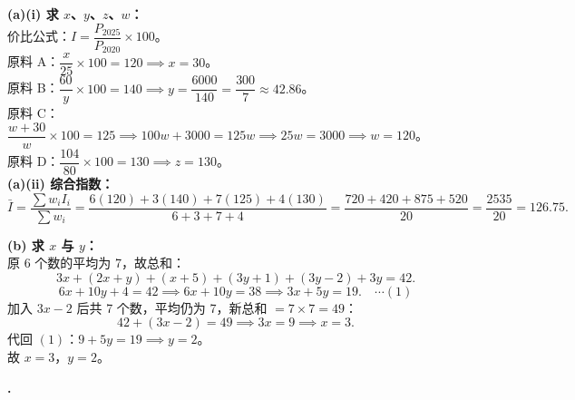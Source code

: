 \documentclass[12pt,a4paper]{ctexart}
\newcounter{qnum}
\newenvironment{question}
  {%
    \stepcounter{qnum}%
    \vspace{0.8em}%
    \noindent\textbf{\theqnum.}\enspace
  }
  {\par\vspace{0.4em}}
\newenvironment{solution}
  {%
    \par\noindent
  }
  {\par}
\begin{document}
\begin{solution}
    \textbf{(a)(i) 求 $x$、$y$、$z$、$w$：} \\
    价比公式：$I = \dfrac{P_{2025}}{P_{2020}}\times100$。\\
    原料 A：$\dfrac{x}{25}\times100 = 120 \implies x = 30$。\\
    原料 B：$\dfrac{60}{y}\times100 = 140 \implies y = \dfrac{6000}{140} = \dfrac{300}{7} \approx 42.86$。\\
    原料 C：$\dfrac{w+30}{w}\times100 = 125 \implies 100w+3000=125w \implies 25w=3000 \implies w=120$。\\
    原料 D：$\dfrac{104}{80}\times100 = 130 \implies z = 130$。\\

    \textbf{(a)(ii) 综合指数：} \\
    \[
        \bar{I} = \frac{\sum w_i I_i}{\sum w_i}
        = \frac{6(120)+3(140)+7(125)+4(130)}{6+3+7+4}
        = \frac{720+420+875+520}{20}
        = \frac{2535}{20}
        = 126.75.
    \]

    \textbf{(b) 求 $x$ 与 $y$：} \\
    原 6 个数的平均为 7，故总和：
    \[
        3x + (2x+y) + (x+5) + (3y+1) + (3y-2) + 3y = 42.
    \]
    \[
        6x + 10y + 4 = 42 \implies 6x + 10y = 38 \implies 3x + 5y = 19. \quad\cdots(1)
    \]
    加入 $3x-2$ 后共 7 个数，平均仍为 7，新总和 $= 7\times7 = 49$：
    \[
        42 + (3x-2) = 49 \implies 3x = 9 \implies x = 3.
    \]
    代回 $(1)$：$9 + 5y = 19 \implies y = 2$。\\
    故 $x = 3$，$y = 2$。
\end{solution}

\begin{question}
\end{question}
\end{document}
